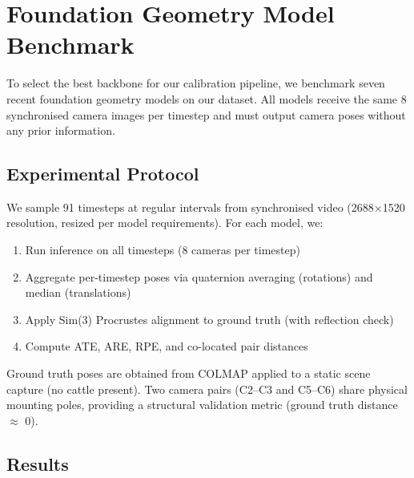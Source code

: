 \section{Foundation Geometry Model Benchmark}
\label{sec:benchmark}

To select the best backbone for our calibration pipeline, we benchmark seven recent foundation geometry models on our dataset. All models receive the same 8 synchronised camera images per timestep and must output camera poses without any prior information.

\subsection{Experimental Protocol}

We sample 91 timesteps at regular intervals from synchronised video (2688$\times$1520 resolution, resized per model requirements). For each model, we:
\begin{enumerate}
    \item Run inference on all timesteps (8 cameras per timestep)
    \item Aggregate per-timestep poses via quaternion averaging (rotations) and median (translations)
    \item Apply Sim(3) Procrustes alignment to ground truth (with reflection check)
    \item Compute ATE, ARE, RPE, and co-located pair distances
\end{enumerate}

Ground truth poses are obtained from COLMAP applied to a static scene capture (no cattle present). Two camera pairs (C2--C3 and C5--C6) share physical mounting poles, providing a structural validation metric (ground truth distance $\approx$ 0).

\subsection{Results}

